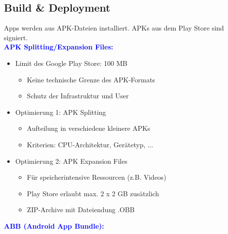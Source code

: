 \subsection{Build \& Deployment}
Apps werden aus APK-Dateien installiert. APKs aus dem Play Store sind signiert.\\
\textbf{\textcolor{blue}{APK Splitting/Expansion Files:}}\\
\begin{itemize}[topsep=0pt, leftmargin=4mm]
    \setlength\itemsep{-0.3em}
    \item Limit des Google Play Store: 100 MB
    \begin{itemize}[topsep=0pt, leftmargin=4mm]
        \setlength\itemsep{-0.3em}
        \item Keine technische Grenze des APK-Formats
        \item Schutz der Infrastruktur und User
    \end{itemize}
    \item Optimierung 1: APK Splitting
    \begin{itemize}[topsep=0pt, leftmargin=4mm]
        \setlength\itemsep{-0.3em}
        \item Aufteilung in verschiedene kleinere APKs
        \item Kriterien: CPU-Architektur, Gerätetyp, ...
    \end{itemize}
    \item Optimierung 2: APK Expansion Files
    \begin{itemize}[topsep=0pt, leftmargin=4mm]
        \setlength\itemsep{-0.3em}
        \item Für speicherintensive Ressourcen (z.B. Videos)
        \item Play Store erlaubt max. 2 x 2 GB zusätzlich
        \item ZIP-Archive mit Dateiendung .OBB
    \end{itemize}
\end{itemize}
\textbf{\textcolor{blue}{ABB (Android App Bundle):}}\\
